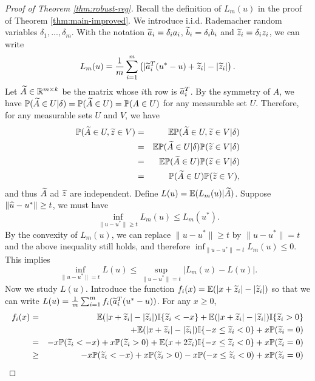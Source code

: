 \begin{proof}[Proof of Theorem \ref{thm:robust-reg}]
Recall the definition of $L_m(u)$ in the proof of Theorem \ref{thm:main-improved}.
We introduce i.i.d. Rademacher random variables $\delta_1,...,\delta_m$. With the notation $\widetilde{a}_i=\delta_ia_i$, $\widetilde{b}_i=\delta_ib_i$ and $\widetilde{z}_i=\delta_iz_i$, we can write
$$
L_m(u) = \frac{1}{m}\sum_{i=1}^m\left(|\widetilde{a}_i^T(u^*-u)+\widetilde{z}_i|-|\widetilde{z}_i|\right).
$$
Let $\widetilde{A}\in\mathbb{R}^{m\times k}$ be the matrix whose $i$th row is $\widetilde{a}_i^T$. By the symmetry of $A$, we have $\mathbb{P}(\widetilde{A}\in U|\delta)=\mathbb{P}(\widetilde{A}\in U)=\mathbb{P}(A\in U)$ for any measurable set $U$. Therefore, for any measurable sets $U$ and $V$, we have
\begin{eqnarray*}
\mathbb{P}(\wt{A}\in U, \wt{z}\in V) &=& \mathbb{E}\mathbb{P}(\wt{A}\in U, \wt{z}\in V|\delta) \\
&=& \mathbb{E}\mathbb{P}(\wt{A}\in U|\delta)\mathbb{P}(\wt{z}\in V|\delta) \\
&=& \mathbb{E}\mathbb{P}(\wt{A}\in U)\mathbb{P}(\wt{z}\in V|\delta) \\
&=& \mathbb{P}(\wt{A}\in U)\mathbb{P}(\wt{z}\in V),
\end{eqnarray*}
and thus $\widetilde{A}$ ad $\widetilde{z}$ are independent. Define $L(u)=\mathbb{E}(L_m(u)|\widetilde{A})$. Suppose $\|\widehat{u}-u^*\|\geq t$, we must have
$$\inf_{\|u-u^*\|\geq t}L_m(u) \leq L_m(u^*).$$
By the convexity of $L_m(u)$, we can replace $\|u-u^*\|\geq t$ by $\|u-u^*\| = t$ and the above inequality still holds, and therefore $\inf_{\|u-u^*\|= t}L_m(u)\leq 0$. This implies
\begin{equation}
\inf_{\|u-u^*\|=t}L(u) \leq \sup_{\|u-u^*\|= t}|L_m(u)-L(u)|. \label{eq:basic-L}
\end{equation}
Now we study $L(u)$. Introduce the function $f_i(x)=\mathbb{E}(|x+\widetilde{z}_i|-|\widetilde{z}_i|)$ so that we can write $L(u)=\frac{1}{m}\sum_{i=1}^mf_i(\widetilde{a}_i^T(u^*-u))$. For any $x\geq 0$,
\begin{eqnarray*}
f_i(x) &=& \mathbb{E}(|x+\wt{z}_i|-|\wt{z}_i|)\mathbb{I}\{\wt{z}_i<-x\} + \mathbb{E}(|x+\wt{z}_i|-|\wt{z}_i|)\mathbb{I}\{\wt{z}_i> 0\} \\
&& + \mathbb{E}(|x+\wt{z}_i|-|\wt{z}_i|)\mathbb{I}\{-x\leq \wt{z}_i< 0\} + x\mathbb{P}(\wt{z}_i=0) \\
&=& -x\mathbb{P}(\wt{z}_i<-x) + x\mathbb{P}(\wt{z}_i> 0) + \mathbb{E}(x+2\wt{z}_i)\mathbb{I}\{-x\leq \wt{z}_i<0\}   + x\mathbb{P}(\wt{z}_i=0) \\
&\geq& -x\mathbb{P}(\wt{z}_i<-x) + x\mathbb{P}(\wt{z}_i> 0) - x\mathbb{P}(-x\leq \wt{z}_i< 0)   + x\mathbb{P}(\wt{z}_i=0) \\

\end{eqnarray*}
\end{proof}
